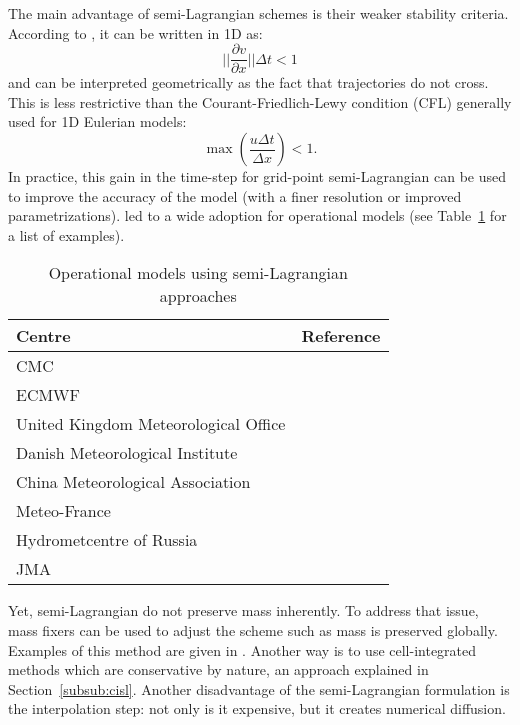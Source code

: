The main advantage of semi-Lagrangian schemes is their weaker stability
criteria. According to \cite{Smolarkiewicz1992}, it can be written in 1D as:
\begin{equation}
  ||\frac{\partial v}{\partial x}|| \Delta t < 1
\end{equation}
and can be interpreted geometrically as the fact that trajectories do not cross.
This is less restrictive than the Courant-Friedlich-Lewy condition (CFL) generally
used for 1D Eulerian models:
\begin{equation}
  \max{( \frac{u \Delta t}{\Delta x} )} < 1.
\end{equation}
In practice, this gain in the time-step for grid-point semi-Lagrangian can be
used to improve the accuracy of the model (with a finer resolution or improved
parametrizations). \DIFdelbegin {}\DIFdelend \DIFaddbegin {}\DIFaddend led to a wide
adoption for operational models (see Table~\ref{tab:sl-models} for a list of
examples). 
\begin{table}
  \centering
  \begin{tabular}{ll}
    \toprule
    Centre & Reference \\
    \midrule
    \gls{CMC} & \cite{Cote1998} \\
    \gls{ECMWF} & \cite{Ritchie1995}\\
    United Kingdom Meteorological Office & \cite{Davies2005} \\
    Danish Meteorological Institute & \cite{Nair2002} \\
    China Meteorological Association & \cite{Chen2008} \\
    Meteo-France & \cite{Bubnova1995} \\
    Hydrometcentre of Russia & \cite{Tolstykh2001} \\
    \gls{JMA} & \cite{JMA2013}\\
    \bottomrule
  \end{tabular}
  \caption{Operational models using semi-Lagrangian approaches}
  \label{tab:sl-models}
\end{table}
Yet, semi-Lagrangian do not preserve mass inherently. To address that issue,
mass fixers can be used to adjust the scheme such as mass is preserved globally.
Examples of this method are given in
\cite{Priestley1993,Moorthi1993,Williamson1994}. Another way is to use
cell-integrated methods which are conservative by nature, an approach explained
in Section~\ref{subsub:cisl}. Another disadvantage of the semi-Lagrangian
formulation is the interpolation step: not only is it expensive, but it
creates numerical diffusion. 

